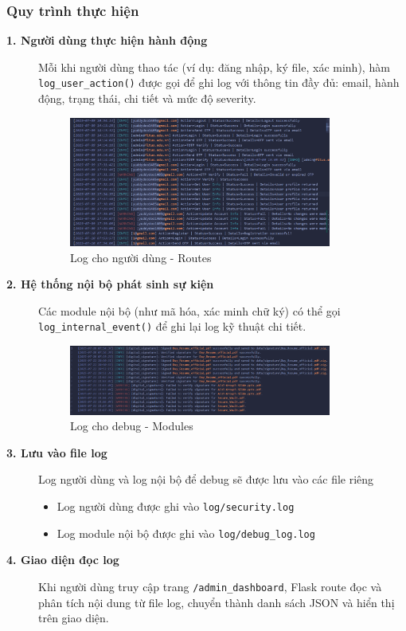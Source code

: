 \subsubsection*{Quy trình thực hiện}
\begin{description}
    \item[\textbf{1. Người dùng thực hiện hành động}]
    Mỗi khi người dùng thao tác (ví dụ: đăng nhập, ký file, xác minh), hàm \texttt{log\_user\_action()} được gọi để ghi log với thông tin đầy đủ: email, hành động, trạng thái, chi tiết và mức độ severity.

    \begin{figure}[H]
        \centering
        \includegraphics[width=0.85\textwidth]{img/11_logger/11_logger_file.png}
        \caption{Log cho người dùng - Routes}
    \end{figure}

    \item[\textbf{2. Hệ thống nội bộ phát sinh sự kiện}]
    Các module nội bộ (như mã hóa, xác minh chữ ký) có thể gọi \texttt{log\_internal\_event()} để ghi lại log kỹ thuật chi tiết.
    \begin{figure}[H]
        \centering
        \includegraphics[width=0.85\textwidth]{img/11_logger/11_logger_debug.png}
        \caption{Log cho debug - Modules}
    \end{figure}

    \item[\textbf{3. Lưu vào file log}]
    Log người dùng và log nội bộ để debug sẽ được lưu vào các file riêng
    \begin{itemize}
        \item Log người dùng được ghi vào \texttt{log/security.log}
        \item Log module nội bộ được ghi vào \texttt{log/debug\_log.log}
    \end{itemize}

    \item[\textbf{4. Giao diện đọc log}]
    Khi người dùng truy cập trang \texttt{/admin\_dashboard}, Flask route đọc và phân tích nội dung từ file log, chuyển thành danh sách JSON và hiển thị trên giao diện.
\end{description}

